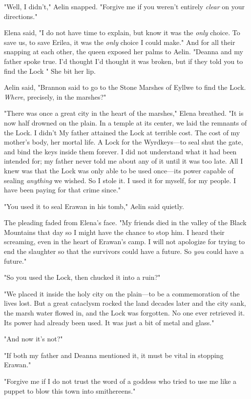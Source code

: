 "Well, I didn't," Aelin snapped. "Forgive me if you weren't entirely
\emph{clear} on your directions."

Elena said, "I do not have time to explain, but know it was the
\emph{only} choice. To save us, to save Erilea, it was the \emph{only}
choice I could make." And for all their snapping at each other, the queen exposed her palms to Aelin. "Deanna and my father spoke true. I'd thought  I'd thought it was broken, but if they told you to find the Lock  " She bit her lip.

Aelin said, "Brannon said to go to the Stone Marshes of Eyllwe to find the Lock. \emph{Where}, precisely, in the marshes?"

"There was once a great city in the heart of the marshes," Elena breathed. "It is now half drowned on the plain. In a temple at its center, we laid the remnants of the Lock. I didn't  My father attained the Lock at terrible cost. The cost  of my mother's body, her mortal life. A Lock for the Wyrdkeys---to seal shut the gate, and bind the keys inside them forever. I did not understand what it had been intended for; my father never told me about any of it until it was too late. All I knew was that the Lock was only able to be used once---its power capable of sealing \emph{anything} we wished. So I stole it. I used it for myself, for my people. I have been paying for that crime since."

"You used it to seal Erawan in his tomb," Aelin said quietly.

The pleading faded from Elena's face. "My friends died in the valley of the Black Mountains that day so I might have the chance to stop him. I heard their screaming, even in the heart of Erawan's camp. I will not apologize for trying to end the slaughter so that the survivors could have a future. So \emph{you} could have a future."

"So you used the Lock, then chucked it into a ruin?"

"We placed it inside the holy city on the plain---to be a commemoration of the lives lost. But a great cataclysm rocked the land decades later
 and the city sank, the marsh water flowed in, and the Lock was forgotten. No one ever retrieved it. Its power had already been used. It was just a bit of metal and glass."

"And now it's not?"

"If both my father and Deanna mentioned it, it must be vital in stopping Erawan."

"Forgive me if I do not trust the word of a goddess who tried to use me like a puppet to blow this town into smithereens."

